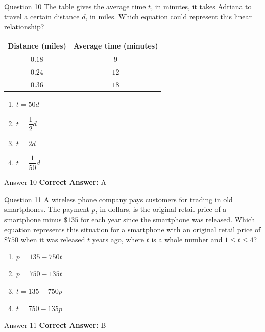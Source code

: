 \documentclass{beamer}
\begin{document}
\begin{frame}{Question 10}
\small
The table gives the average time \(t\), in minutes, it takes Adriana to travel a certain distance \(d\), in miles. Which equation could represent this linear relationship?

\begin{center}
\begin{tabular}{c|c}
Distance (miles) & Average time (minutes) \\
\hline
\(0.18\) & \(9\) \\
\(0.24\) & \(12\) \\
\(0.36\) & \(18\) \\
\end{tabular}
\end{center}
\vspace{0.35cm}
\begin{enumerate}
    \item[A.] \(t = 50d\)
    \item[B.] \(t = \dfrac{1}{2}d\)
    \item[C.] \(t = 2d\)
    \item[D.] \(t = \dfrac{1}{50}d\)
\end{enumerate}
\end{frame}
\begin{frame}{Answer 10}
\small
\textbf{Correct Answer:} A
\end{frame}

\begin{frame}{Question 11}
\small
A wireless phone company pays customers for trading in old smartphones. The payment \(p\), in dollars, is the original retail price of a smartphone minus \(\$135\) for each year since the smartphone was released.
Which equation represents this situation for a smartphone with an original retail price of \(\$750\) when it was released \(t\) years ago, where \(t\) is a whole number and \(1 \le t \le 4\)?
\vspace{0.35cm}
\begin{enumerate}
    \item[A.] \(p = 135 - 750t\)
    \item[B.] \(p = 750 - 135t\)
    \item[C.] \(t = 135 - 750p\)
    \item[D.] \(t = 750 - 135p\)
\end{enumerate}
\end{frame}
\begin{frame}{Answer 11}
\small
\textbf{Correct Answer:} B
\end{frame}
\end{document}
